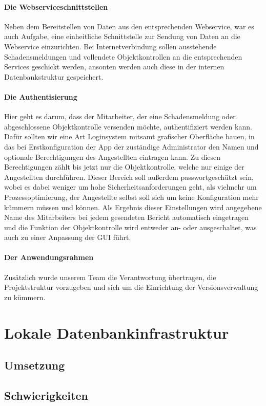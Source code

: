 \documentclass[12pt]{article}
\begin{document}
\paragraph{Die Webserviceschnittstellen} Neben dem Bereitstellen von Daten aus den entsprechenden Webservice, war es auch Aufgabe, eine einheitliche Schnittstelle zur Sendung von Daten an die Webservice einzurichten. Bei Internetverbindung sollen ausstehende Schadensmeldungen und vollendete Objektkontrollen an die entsprechenden Services geschickt werden, ansonten werden auch diese in der internen Datenbankstruktur gespeichert.
\paragraph{Die Authentisierung} Hier geht es darum, dass der Mitarbeiter, der eine Schadensmeldung oder abgeschlossene Objektkontrolle versenden möchte, authentifiziert werden kann. Dafür sollten wir eine Art Loginsystem mitsamt grafischer Oberfläche bauen, in das bei Erstkonfiguration der App der zuständige Administrator den Namen und optionale Berechtigungen des Angestellten eintragen kann. Zu diesen Berechtigungen zählt bis jetzt nur die Objektkontrolle, welche nur einige der Angestellten durchführen. Dieser Bereich soll außerdem passwortgeschützt sein, wobei es dabei weniger um hohe Sicherheitsanforderungen geht, als vielmehr um Prozessoptimierung, der Angestellte selbst soll sich um keine Konfiguration mehr kümmern müssen und können. Als Ergebnis dieser Einstellungen wird angegebene Name des Mitarbeiters bei jedem gesendeten Bericht automatisch eingetragen und die Funktion der Objektkontrolle wird entweder an- oder ausgeschaltet, was auch zu einer Anpassung der GUI führt.
\paragraph{Der Anwendungsrahmen} Zusätzlich wurde unserem Team die Verantwortung übertragen, die Projektstruktur vorzugeben und sich um die Einrichtung der Versionsverwaltung zu kümmern.

\section{Lokale Datenbankinfrastruktur}
\subsection{Umsetzung}
\subsection{Schwierigkeiten}
\end{document}
